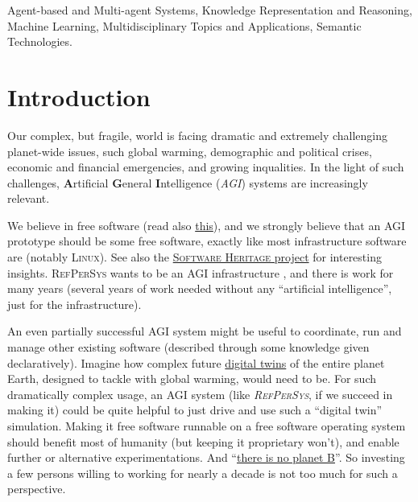 \documentclass{IEEEtran}
\newcommand{\RefPerSys}{{\textit{\textsc{RefPerSys}}}}
\begin{document}
\begin{IEEEkeywords}
Agent-based and Multi-agent Systems, Knowledge Representation and Reasoning,
  Machine Learning, Multidisciplinary Topics and Applications, Semantic
  Technologies.
\end{IEEEkeywords}






%
\IEEEpeerreviewmaketitle



\section{Introduction}
Our complex, but fragile, world is facing dramatic and extremely challenging
planet-wide issues, such global warming, demographic and political crises,
economic and financial emergencies, and growing inqualities. In the light of
such challenges, \textbf{A}rtificial \textbf{G}eneral \textbf{I}ntelligence
(\emph{AGI}) systems are increasingly relevant.

We believe in free software  (read also
\href{https://www.fsf.org/about/what-is-free-software}{this}), and we
strongly believe that an AGI prototype should be some free software,
exactly like most infrastructure software are (notably
\textsc{Linux}). See also the
\href{https://www.softwareheritage.org/}{\textsc{Software Heritage}
  project}  for interesting insights. \textsc{RefPerSys} wants to be an
AGI infrastructure , and there is work for many years (several years of
work needed without any ``artificial intelligence'', just for the
infrastructure).

An even partially successful \textsc{AGI} system might be useful to
coordinate, run and manage other existing software (described through
some knowledge given declaratively). Imagine how complex future
\href{https://en.wikipedia.org/wiki/Digital_twin}{digital twins} of
the entire planet Earth, designed to tackle with global warming, would
need to be. For such dramatically complex usage, an AGI system (like
{\RefPerSys}, if we succeed in making it) could be quite helpful to
just drive and use such a ``digital twin'' simulation. Making it free
software runnable on a free software operating system should benefit
most of humanity (but keeping it proprietary won't), and enable
further or alternative experimentations. And
``\href{https://theresnoplanetb.net/}{there is no planet
  B}''. So investing a few persons willing to working
for nearly a decade is not too much for such a perspective.
\end{document}
